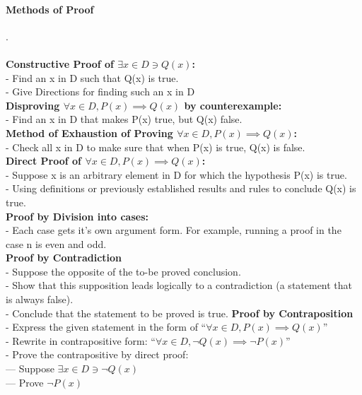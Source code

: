 \documentclass[10pt,letterpaper]{article}
\begin{document}
\begin{multicols}{2}
\paragraph{Methods of Proof}.\\\\
\textbf{Constructive Proof of $\exists x\in D \ni Q(x)$:}\\
- Find an x in D such that Q(x) is true.\\
- Give Directions for finding such an x in D\\
\textbf{Disproving $\forall x \in D, P(x) \implies Q(x)$ by counterexample:}\\
- Find an x in D that makes P(x) true, but Q(x) false.\\
\textbf{Method of Exhaustion of Proving $\forall x \in D, P(x) \implies Q(x)$:}\\
- Check all x in D to make sure that when P(x) is true, Q(x) is false.\\
\textbf{Direct Proof of $\forall x \in D, P(x) \implies Q(x)$:}\\
- Suppose x is an arbitrary element in D for which the hypothesis P(x) is true.\\
- Using definitions or previously established results and rules to conclude Q(x) is true.\\
\textbf{Proof by Division into cases:}\\
- Each case gets it's own argument form. For example, running a proof in the case n is even and odd.\\
\textbf{Proof by Contradiction}\\
- Suppose the opposite of the to-be proved conclusion.\\
- Show that this supposition leads logically to a contradiction (a statement that is always false).\\
- Conclude that the statement to be proved is true.
\textbf{Proof by Contraposition}\\
- Express the given statement in the form of ``$\forall x \in D, P(x) \implies Q(x)$''\\
- Rewrite in contrapositive form: ``$\forall x \in D, \neg Q(x) \implies \neg P(x)$''\\
- Prove the contrapositive by direct proof:\\
--- Suppose $\exists x \in D \ni \neg Q(x)$\\
--- Prove $\neg P(x)$

\vspace{9999pt}

\end{multicols}
\end{document}
